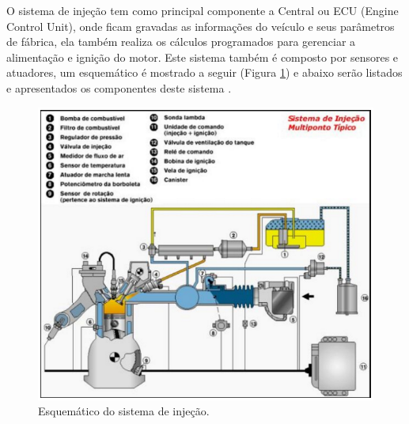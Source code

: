 	O sistema de injeção tem como principal componente a Central ou ECU (Engine Control Unit), onde ficam gravadas as informações do veículo e seus parâmetros de fábrica, ela também realiza os cálculos programados para gerenciar a alimentação e ignição do motor. Este sistema também é composto por sensores e atuadores, um esquemático é mostrado a seguir (Figura \ref{fig:oleomotor}) e abaixo serão listados e apresentados os componentes deste sistema \cite{brunetti2012}.
	
\begin{figure}[h!]
	\centering
	\includegraphics[keepaspectratio=true,scale= 0.7]{figuras/esquematicoinjecao.png}
	\caption{Esquemático do sistema de injeção.}
	\label{fig:oleomotor}
\end{figure}

